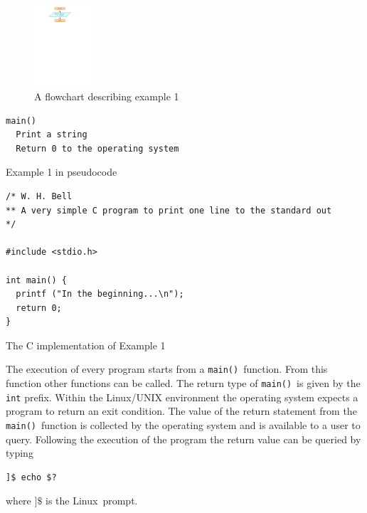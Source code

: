 \documentclass[11pt]{scrartcl}
\def\main{\texttt{main()}}
\def\linux{Linux}
\begin{document}
\begin{figure}[h]
\begin{center}
\includegraphics[height=3cm]{figures/ex1}
\caption{A flowchart describing example 1
\label{figure:flowchart_ex1}}
\end{center}
\end{figure}

\begin{pseudocode}[h]
\begin{verbatim}
main()
  Print a string
  Return 0 to the operating system
\end{verbatim}
\caption{Example 1 in pseudocode \label{pseudo:ex1}}
\end{pseudocode}

\begin{program}[H]
\begin{lstlisting}
/* W. H. Bell
** A very simple C program to print one line to the standard out
*/

#include <stdio.h>

int main() {
  printf ("In the beginning...\n");
  return 0;
}
\end{lstlisting}
\caption{The C implementation of Example 1 \label{listing:ex1}}
\end{program}

The execution of every program starts from a \main\ function.  From this function other functions can be called.  The return type of \main\ is given by the \texttt{int} prefix.  Within the \linux/UNIX environment the operating system expects a program to return an exit condition.  The value of the return statement from the \main\ function is collected by the operating system and is available to a user to query.  Following the execution of the program the return value can be queried by typing
\begin{verbatim}
]$ echo $?
\end{verbatim}
where \texttt{$]\$$} is the \linux\ prompt.
\end{document}
